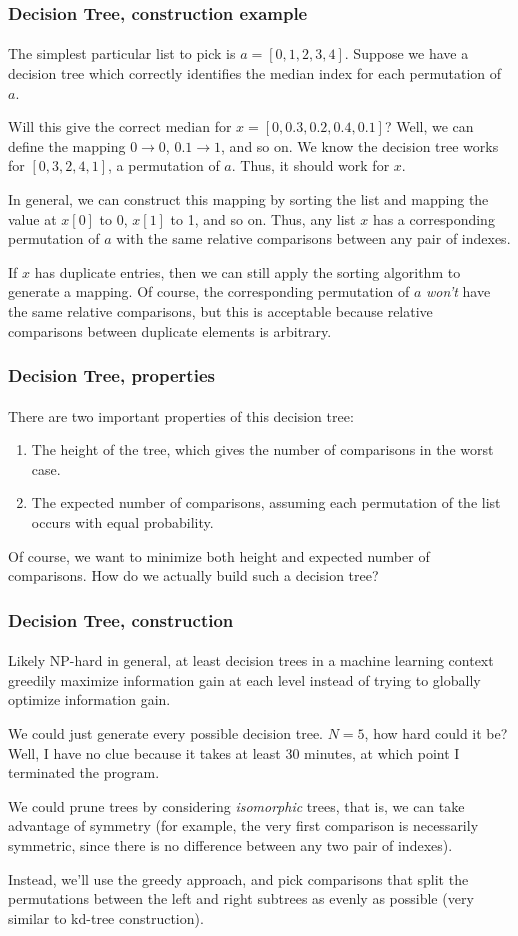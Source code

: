 \documentclass{beamer}                             %
\begin{document}
\begin{frame}
\frametitle{Decision Tree, construction example}
\framesubtitle{}
The simplest particular list to pick is \( a = [0, 1, 2, 3, 4] \).
Suppose we have a decision tree which correctly identifies the median index
for each permutation of \( a \). \pause

Will this give the correct median for \( x = [0, 0.3, 0.2, 0.4, 0.1] \)?
Well, we can define the mapping \( 0 \rightarrow 0 \), \( 0.1 \rightarrow 1 \),
and so on. We know the decision tree works for \( [0, 3, 2, 4, 1] \),
a permutation of \( a \). Thus, it should work for \( x \). \pause

In general, we can construct this mapping by sorting the list and
mapping the value at \( x[0] \) to 0, \( x[1] \) to 1, and so on.
Thus, any list \( x \) has a corresponding permutation of \( a \)
with the same relative comparisons between any pair of indexes. \pause

If \( x \) has duplicate entries, then we can still apply the sorting algorithm
to generate a mapping. Of course, the corresponding permutation of \( a \)
\textit{won't} have the same relative comparisons, but this is acceptable
because relative comparisons between duplicate elements is arbitrary. 
\end{frame}

\begin{frame}
\frametitle{Decision Tree, properties}
\framesubtitle{}
There are two important properties of this decision tree:
\begin{enumerate}
  \item The height of the tree, which gives the number of comparisons in the
    worst case.
  \item The expected number of comparisons, assuming each permutation
    of the list occurs with equal probability. 
\end{enumerate} \pause
Of course, we want to minimize both height and expected number of comparisons.
How do we actually build such a decision tree?
\end{frame}

\begin{frame}
\frametitle{Decision Tree, construction}
\framesubtitle{}
Likely NP-hard in general, at least decision trees in a machine learning
context greedily maximize information gain at each level instead of trying
to globally optimize information gain. \pause

We could just generate every possible decision tree.
\( N = 5 \), how hard could it be?
Well, I have no clue because it takes at least 30 minutes,
at which point I terminated the program. \pause

We could prune trees by considering \textit{isomorphic} trees,
that is, we can take advantage of symmetry
(for example, the very first comparison is necessarily symmetric,
since there is no difference between any two pair of indexes). \pause

Instead, we'll use the greedy approach, and pick comparisons
that split the permutations between the left and right subtrees as evenly
as possible (very similar to kd-tree construction).
\end{frame}
\end{document}
